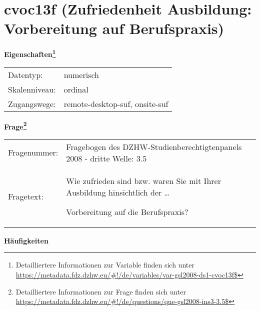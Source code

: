 
    \setcounter{footnote}{0}

    \vspace*{-1.8cm}
	\section{cvoc13f (Zufriedenheit Ausbildung: Vorbereitung auf Berufspraxis)}
	\label{section:cvoc13f}



    \vspace*{0.5cm}
    \noindent\textbf{Eigenschaften\footnote{Detailliertere Informationen zur Variable finden sich unter
		\url{https://metadata.fdz.dzhw.eu/\#!/de/variables/var-gsl2008-ds1-cvoc13f$}}}\\
	\begin{tabularx}{\hsize}{@{}lX}
	Datentyp: & numerisch \\
	Skalenniveau: & ordinal \\
	Zugangswege: &
	  remote-desktop-suf, 
	  onsite-suf
 \\
    \end{tabularx}



				\vspace*{0.5cm}
                \noindent\textbf{Frage\footnote{Detailliertere Informationen zur Frage finden sich unter
		              \url{https://metadata.fdz.dzhw.eu/\#!/de/questions/que-gsl2008-ins3-3.5$}}}\\
				\begin{tabularx}{\hsize}{@{}lX}
					Fragenummer: &
					  Fragebogen des DZHW-Studienberechtigtenpanels 2008 - dritte Welle:
					  3.5
 \\
					Fragetext: & Wie zufrieden sind bzw. waren Sie mit Ihrer Ausbildung hinsichtlich der …\par  Vorbereitung auf die Berufspraxis? \\
				\end{tabularx}





        		\vspace*{0.5cm}
                \noindent\textbf{Häufigkeiten}

